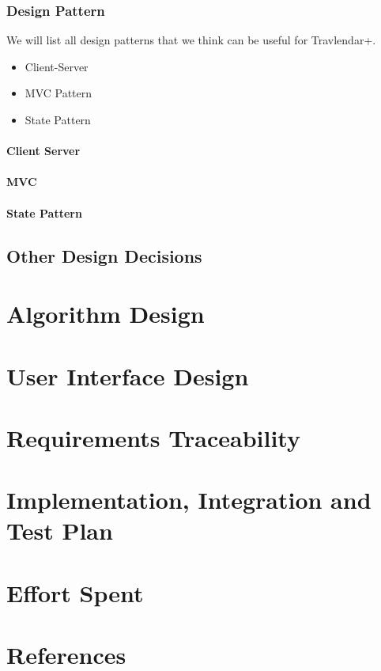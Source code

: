 \documentclass[12pt,titlepage]{article}
\begin{document}
\subsubsection{Design Pattern}
We will list all design patterns that we think can be useful for Travlendar+.

\begin{itemize}
\item Client-Server
\item MVC Pattern
\item State Pattern
\end{itemize}

\paragraph{Client Server}
\paragraph{MVC}
\paragraph{State Pattern}
\subsection{Other Design Decisions}

\section{Algorithm Design}

\section{User Interface Design}

\section{Requirements Traceability}

\section{Implementation, Integration and Test Plan}

\section{Effort Spent}

\section{References}
\end{document}
